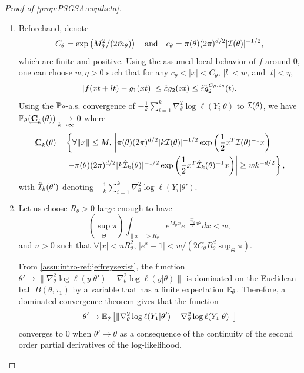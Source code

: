 \begin{proof}[Proof of \cref{prop:PSGSA:cvptheta}]
\begin{enumerate}
    \item Beforehand, denote
    \begin{equation}
        C_\theta =\exp\left(M_\theta^2/(2\hat m_\theta)\right) \quad\text{and}\quad  c_\theta = \pi(\theta)(2\pi)^{d/2}|\mathcal{I}(\theta)|^{-1/2} ,
    \end{equation}
    which are finite and positive. Using the assumed local behavior of $f$ around $0$, one can choose $ w,\eta>0$ such that for any $c_\theta<|x|<C_\theta$, $|l|< w$, and $|t|<\eta$, 
    \begin{equation}\label{eq:PSGSA:asymptdevf}
        |f(xt+lt)-g_1(xt)|\leq\tilde{\varepsilon} g_2(xt)\leq\tilde{\varepsilon}\tilde g_2^{C_\theta,c_\theta}(t).    
    \end{equation}
    Using the $\mathbb{P}_\theta$-a.s. convergence of $-\frac{1}{k}\sum_{i=1}^k\nabla^2_\theta\log\ell(Y_i|\theta)$ to $\mathcal{I}(\theta)$, we have $\mathbb{P}_\theta( \underline{\mathbf{C}}_k(\theta))\overset{\ }{\underset{k\rightarrow\infty}{\longrightarrow}}0$ where
    \begin{align}
    \nonumber
         \underline{\mathbf{C}}_k(\theta) = &\left\{\forall \|x\|\leq M,\, \left|\pi(\theta)(2\pi)^{d/2}|k\mathcal{I}(\theta)|^{-1/2}\exp\left(\frac{1}{2}x^T \mathcal{I}(\theta)^{-1}x\right) \right.\right. \\
        & \left.\left. - \pi(\theta)(2\pi)^{d/2}|k\hat{\mathcal{I}}_k(\theta)|^{-1/2}\exp\left(\frac{1}{2}x^T \hat{\mathcal{I}}_k(\theta)^{-1} x\right) \right|\geq w k^{-d/2}\right\} ,
    \end{align}
    with $\hat{\mathcal{I}}_k(\theta')$ denoting $-\frac{1}{k}\sum_{i=1}^k\nabla^2_\theta\log\ell(Y_i|\theta')$.
    
    \item 
    Let us choose $R_\theta>0$ large enough to have 
    \begin{equation}\label{eq:PSGSA:majorintegralsR}
        (\sup_{\tilde\Theta}\pi ) \int_{\|x\|>R_\theta} e^{M_\theta x}e^{-\frac{\hat m_\theta}{2}x^2} dx< w ,    
    \end{equation}
and $u>0$ such that $\forall|x|<uR_\theta^2,\,|e^{x}-1|< w/(2 C_\theta R^d_\theta\sup_{\tilde\Theta}\pi )$. 

From \cref{assu:intro-ref:jeffreysexist}, the function $\theta'\mapsto\|\nabla_\theta^2\log\ell(y|\theta')-\nabla^2_\theta\log\ell(y|\theta)\|$ is dominated on the Euclidean ball $B(\theta,\tau_1)$ by a variable that has a finite expectation $\mathbb{E}_\theta$. Therefore, a dominated convergence theorem gives that the function
    \begin{equation}
        \theta'\mapsto \mathbb{E}_\theta \left[\|\nabla_\theta^2\log\ell(Y_1|\theta')-\nabla^2_\theta\log\ell(Y_1|\theta)\|\right]
    \end{equation}
    converges to $0$ when $\theta'\to\theta$ as a consequence of the continuity of the second order partial derivatives of the log-likelihood. 
    

\end{enumerate}
\end{proof}
